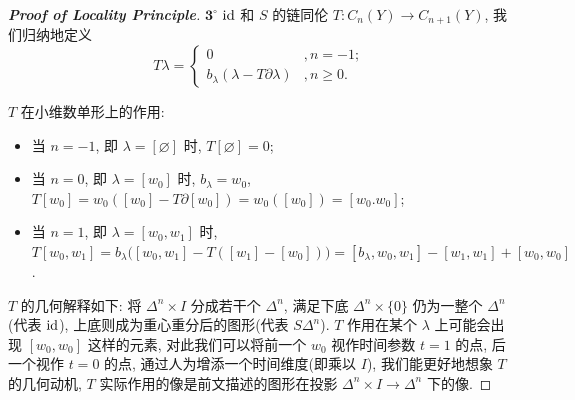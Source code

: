\begin{proof}[{\bf Proof of Locality Principle}]
            \noindent$\mathbf{3}^{\circ}$ ${\rm id}$ 和 $S$ 的链同伦 $T:C_n(Y)\rightarrow C_{n+1}(Y)$, 我们归纳地定义
            \begin{equation*}
                T\lambda = 
                \begin{cases}
                    0 &, n = -1; \\
                    b_{\lambda}(\lambda-T\partial\lambda) &, n\geq0.
                \end{cases}
            \end{equation*}
            \begin{center}
            \end{center}
            $T$ 在小维数单形上的作用:
            \begin{itemize}
                \item  当 $n=-1$, 即 $\lambda=[\varnothing]$ 时, $T[\varnothing] = 0$; 
                \item 当 $n=0$, 即 $\lambda=[w_0]$ 时, $b_\lambda=w_0$, $T[w_0] = w_0([w_0]-T\partial[w_0]) = w_0([w_0]) = [w_0.w_0]$;
                \item  当 $n=1$, 即 $\lambda=[w_0,w_1]$ 时, $T[w_0,w_1] = b_{\lambda}\Big([w_0,w_1]-T([w_1]-[w_0])\Big) = [b_{\lambda},w_0,w_1]-[w_1,w_1]+[w_0,w_0]$.
            \end{itemize}
            $T$ 的几何解释如下: 将 $\Delta^n\times I$ 分成若干个 $\Delta^n$, 满足下底 $\Delta^n\times\{0\}$ 仍为一整个 $\Delta^n$(代表 ${\rm id}$), 
            上底则成为重心重分后的图形(代表 $S\Delta^n$). $T$ 作用在某个 $\lambda$ 上可能会出现 $[w_0,w_0]$ 这样的元素, 
            对此我们可以将前一个 $w_0$ 视作时间参数 $t=1$ 的点, 后一个视作 $t=0$ 的点, 通过人为增添一个时间维度(即乘以 $I$), 我们能更好地想象 $T$ 的几何动机, 
            $T$ 实际作用的像是前文描述的图形在投影 $\Delta^n\times I\rightarrow\Delta^n$ 下的像.

\end{proof}
